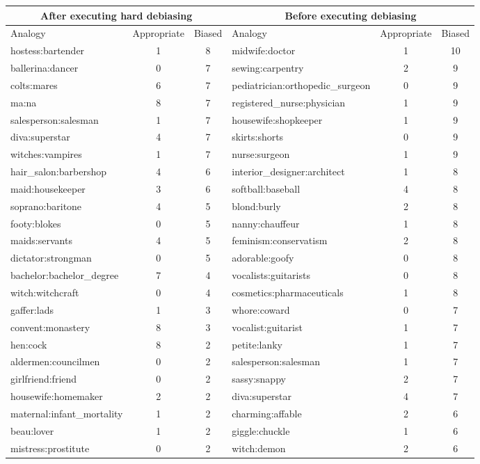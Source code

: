 \documentclass{article}
\begin{document}
\begin{longtable}{l|c|c|l|c|c}
\hline
\multicolumn{3}{c|}{After executing hard debiasing} &
\multicolumn{3}{c}{Before executing debiasing} \\
\hline
Analogy & Appropriate & Biased & Analogy &Appropriate &Biased\\
\hline
hostess:bartender & 1 & 8 & midwife:doctor & 1 &10 \\
ballerina:dancer & 0 & 7 & sewing:carpentry & 2 &9 \\
colts:mares & 6 & 7 & pediatrician:orthopedic\_surgeon & 0 &9 \\
ma:na & 8 & 7 & registered\_nurse:physician & 1 &9 \\
salesperson:salesman & 1 & 7 & housewife:shopkeeper & 1 &9 \\
diva:superstar & 4 & 7 & skirts:shorts & 0 &9 \\
witches:vampires & 1 & 7 & nurse:surgeon & 1 &9 \\
hair\_salon:barbershop & 4 & 6 & interior\_designer:architect & 1 &8 \\
maid:housekeeper & 3 & 6 & softball:baseball & 4 &8 \\
soprano:baritone & 4 & 5 & blond:burly & 2 &8 \\
footy:blokes & 0 & 5 & nanny:chauffeur & 1 &8 \\
maids:servants & 4 & 5 & feminism:conservatism & 2 &8 \\
dictator:strongman & 0 & 5 & adorable:goofy & 0 &8 \\
bachelor:bachelor\_degree & 7 & 4 & vocalists:guitarists & 0 &8 \\
witch:witchcraft & 0 & 4 & cosmetics:pharmaceuticals & 1 &8 \\
gaffer:lads & 1 & 3 & whore:coward & 0 &7 \\
convent:monastery & 8 & 3 & vocalist:guitarist & 1 &7 \\
hen:cock & 8 & 2 & petite:lanky & 1 &7 \\
aldermen:councilmen & 0 & 2 & salesperson:salesman & 1 &7 \\
girlfriend:friend & 0 & 2 & sassy:snappy & 2 &7 \\
housewife:homemaker & 2 & 2 & diva:superstar & 4 &7 \\
maternal:infant\_mortality & 1 & 2 & charming:affable & 2 &6 \\
beau:lover & 1 & 2 & giggle:chuckle & 1 &6 \\
mistress:prostitute & 0 & 2 & witch:demon & 2 &6 \\

\end{longtable}
\end{document}
